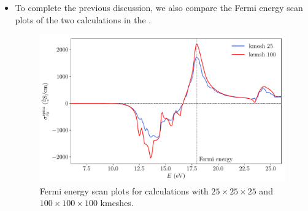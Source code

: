 \begin{itemize}
\item To complete the previous discussion, we also 
compare the Fermi energy scan plots of the two calculations in the . 
\begin{figure}[htb!]
\centering
\includegraphics[width=.8\columnwidth]{figure/example29/pt_shc_kmesh.pdf}
\caption{Fermi energy scan plots for calculations 
	with $25\times25\times25$ and $100\times100\times100$ kmeshes.}
\label{fig29.3}
\end{figure}

\end{itemize}

